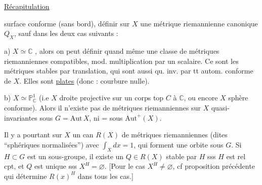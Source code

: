 
\uline{Récapitulation}

 surface conforme (sans bord),  définir sur $X$ une métrique riemannienne canonique $Q_X$,  sauf dans les deux cas suivants :

a) $X\simeq\mathbb C$ , alors on peut définir quand même une classe de métriques riemanniennes compatibles, mod. multiplication par un scalaire. Ce sont les métriques stables par translation, qui sont aussi qu. inv. par tt autom. conforme de $X$. Elles sont \uline{plates} (donc : courbure nulle).

b) $X\simeq\mathbb P^1_{\mathbb C}$ (i.e $X$ droite projective sur un corps top $C$  à $\mathbb C$, ou encore $X$ sphère conforme). Alors il n'existe pas de métriques riemanniennes sur $X$ quasi-invariantes sous $G=\mathrm{Aut}\,X$, ni = sous $\mathrm{Aut}^+(X)$.

 Il y a pourtant sur $X$ un  can $R(X)$ de métriques riemanniennes (dites ``sphériques normalisées'') avec $\int_X dx=1$, qui forment une orbite sous $G$. Si $H\subset G$ est un sous-groupe, il existe un $Q\in R(X)$ stable par $H$ sss $H$ est rel cpt, et $Q$ est unique sss $X^H=\varnothing$. [Pour le cas $X^H\ne\varnothing$, cf proposition précédente qui détermine $R(x)^H$ dans tous les cas.]

